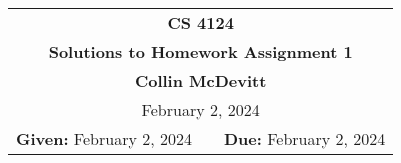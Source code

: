 \documentclass[11pt,twoside]{article}
\newcommand{\coursenumber}{CS 4124}
\newcommand{\docdate}{January 11, 2024}
\newcommand{\duedate}{February 2, 2024}
\newcommand{\homeworknumber}{1}
\newcommand{\doctitle}{Solutions to Homework Assignment \homeworknumber}
\newcommand{\doctitle}{Homework Assignment \homeworknumber}
\renewcommand{\docdate}{\duedate}
\renewcommand{\author}{Collin McDevitt}
\begin{document}
\thispagestyle{empty}

\begin{center}
    \begin{tabular}{lcr}
        \multicolumn{3}{c}{\Large\textbf{\coursenumber}}
        \\[0.04in]
        \multicolumn{3}{c}{\Large\textbf{\doctitle}}
        \ifthenelse{\boolean{solutions}}{%
        \\[0.04in]\multicolumn{3}{c}{\large\textbf{\author}}
        }{} %
        \ifthenelse{\boolean{solutions}}{%
        \\[0.10in]\multicolumn{3}{c}{\duedate}
        }{%
        \\[0.10in]
            \textbf{Given:} \docdate
         & \hspace*{1.0in} &
            \textbf{Due:} \duedate
        }
    \end{tabular}
\end{center}
\end{document}
